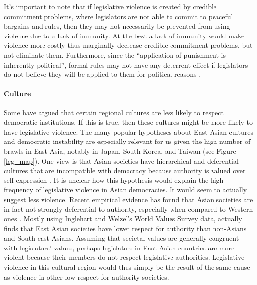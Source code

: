 \documentclass[a4paper]{article}\usepackage[]{graphicx}\usepackage[]{color}
\begin{document}
It's important to note that if legislative violence is created by credible commitment problems, where legislators are not able to commit to peaceful bargains and rules, then they may not necessarily be prevented from using violence due to a lack of immunity. At the best a lack of immunity would make violence more costly thus marginally decrease credible commitment problems, but not eliminate them. Furthermore, since the ``application of punishment is inherently political'', formal rules may not have any deterrent effect if legislators do not believe they will be applied to them for political reasons \cite[58]{Wolfe2004}.

\paragraph{Culture}

Some have argued that certain regional cultures are less likely to respect democratic institutions. If this is true, then these cultures might be more likely to have legislative violence. The many popular hypotheses about East Asian cultures and democratic instability are especially relevant for us given the high number of brawls in East Asia, notably in Japan, South Korea, and Taiwan (see Figure \ref{leg_map}). One view is that Asian societies have hierarchical and deferential cultures that are incompatible with democracy because authority is valued over self-expression \citep[see][212-213 for a discussion]{Dalton2005}. It is unclear how this hypothesis would explain the high frequency of legislative violence in Asian democracies. It would seem to actually suggest less violence. Recent empirical evidence has found that Asian societies are in fact not strongly deferential to authority, especially when compared to Western ones \citep{Dalton2005, KimAsianValues2010}. Mostly using Inglehart and Welzel's World Values Survey data, \cite{KimAsianValues2010} actually finds that East Asian societies have lower respect for authority than non-Asians and South-east Asians. Assuming that societal values are generally congruent with legislators' values, perhaps legislators in East Asian countries are more violent because their members do not respect legislative authorities. Legislative violence in this cultural region would thus simply be the result of the same cause as violence in other low-respect for authority societies.
\end{document}
